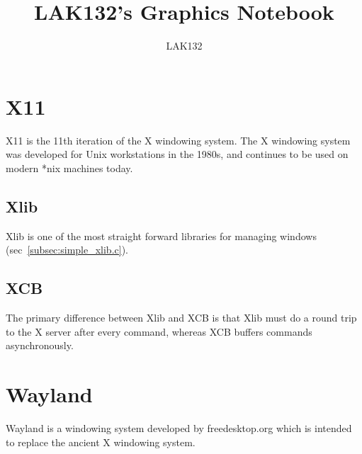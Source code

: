 \documentclass{article}
\title{LAK132's Graphics Notebook}
\author{LAK132}
\begin{document}
\pagecolor{black}
\color{white}

\maketitle

\tableofcontents


\section{X11}
\label{sec:x11}

X11 is the 11th iteration of the X windowing system.
The X windowing system was developed for Unix workstations in the 1980s,
and continues to be used on modern *nix machines today.

\subsection{Xlib}
\label{subsec:xlib}

Xlib is one of the most straight forward libraries for managing windows
(sec~\ref{subsec:simple_xlib.c}).

\subsection{XCB}
\label{subsec:xcb}

The primary difference between Xlib and XCB is that Xlib must do a round trip
to the X server after every command,
whereas XCB buffers commands asynchronously.


\section{Wayland}
\label{sec:wayland}

Wayland is a windowing system developed by freedesktop.org which is intended to
replace the ancient X windowing system.

\end{document}
